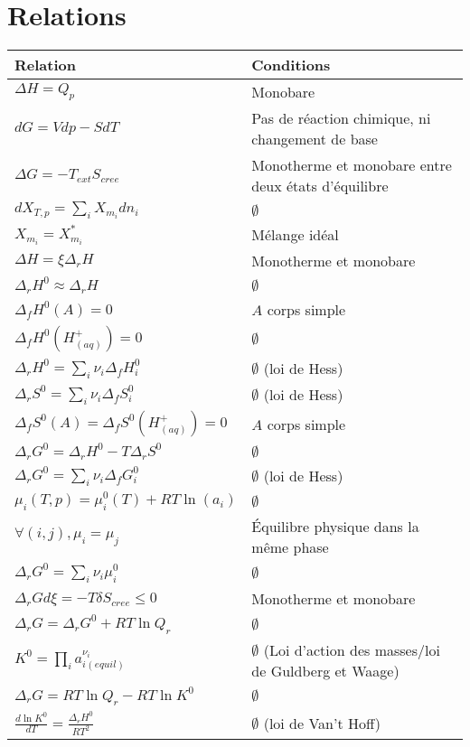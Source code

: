\documentclass[12pt,a4paper] {article}
\begin{document}
\section{Relations}
\begin{tabularx}{\linewidth}{|l|X|} \hline
    \bf{Relation}    & \bf{Conditions} \\ \hline
    $\Delta H = Q_p$ & Monobare \\ \hline
    $dG = Vdp - SdT$ & Pas de réaction chimique, ni changement de base \\ \hline
    $\Delta G = -T_{ext}S_{cree}$ & Monotherme et monobare entre deux états d'équilibre \\ \hline
    $dX_{T,p} = \sum_i X_{m_i}dn_i$ & $\emptyset$ \\ \hline
    $X_{m_i} = X_{m_i}^*$ & Mélange idéal \\ \hline
    $\Delta H = \xi \Delta_r H$ & Monotherme et monobare \\ \hline
    $\Delta_r H^0 \approx \Delta_r H$ & $\emptyset$ \\ \hline
    $\Delta_f H^0(A) = 0$ & $A$ corps simple \\ \hline
    $\Delta_f H^0(H^+_{(aq)}) = 0$ & $\emptyset$ \\ \hline
    $\Delta_r H^0 = \sum_i \nu_i \Delta_f H_i^0$ & $\emptyset$ (loi de Hess) \\ \hline
    $\Delta_r S^0 = \sum_i \nu_i \Delta_f S_i^0$ & $\emptyset$ (loi de Hess) \\ \hline
    $\Delta_f S^0(A) = \Delta_f S^0(H^+_{(aq)}) = 0$ & $A$ corps simple \\ \hline
    $\Delta_r G^0 = \Delta_r H^0 - T\Delta_r S^0$ & $\emptyset$ \\ \hline
    $\Delta_r G^0 = \sum_i \nu_i\Delta_f G_i^0$ & $\emptyset$ (loi de Hess) \\ \hline
    $\mu_i(T,p) = \mu_i^0(T) + RT\ln(a_i)$ & $\emptyset$ \\ \hline
    $\forall (i,j), \mu_i = \mu_j$ & Équilibre physique dans la même phase \\ \hline
    $\Delta_r G^0 = \sum_i \nu_i\mu_i^0$ & $\emptyset$ \\ \hline
    $\Delta_r Gd\xi = -T\delta S_{cree} \leq 0$ & Monotherme et monobare \\ \hline
    $\Delta_r G = \Delta_r G^0 + RT\ln Q_r$ & $\emptyset$ \\ \hline
    $K^0 = \prod_i a_{i(equil)}^{\nu_i}$ & $\emptyset$ (Loi d'action des masses/loi de Guldberg et Waage) \\ \hline
    $\Delta_r G = RT\ln Q_r - RT\ln K^0$ & $\emptyset$ \\ \hline
    $\frac{d\ln K^0}{dT} = \frac{\Delta_r H^0}{RT^2}$ & $\emptyset$ (loi de Van't Hoff) \\ \hline
\end{tabularx}
\end{document}
